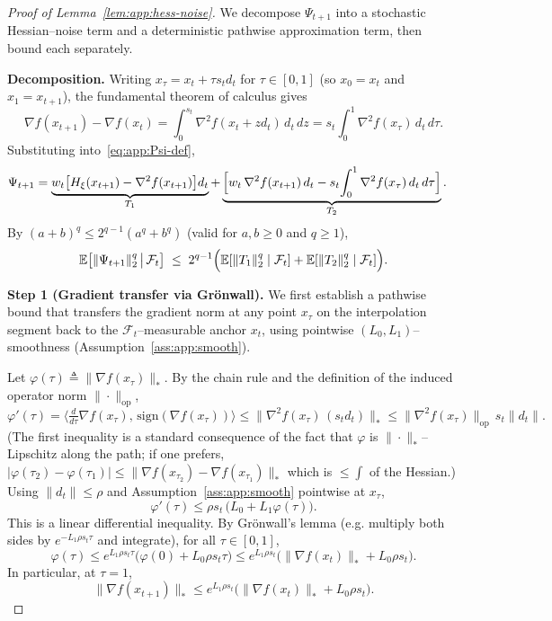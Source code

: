 \documentclass[10pt,a4paper]{amsart}
\begin{document}
\begin{proof}[Proof of Lemma~\ref{lem:app:hess-noise}]
We decompose $\Psi_{t+1}$ into a stochastic Hessian--noise term and a
deterministic pathwise approximation term, then bound each separately.

\smallskip\noindent\textbf{Decomposition.}
Writing $x_\tau = x_t + \tau s_t d_t$ for $\tau \in [0, 1]$ (so $x_0 =
x_t$ and $x_1 = x_{t+1}$), the fundamental theorem of calculus gives
\[
  \nabla f(x_{t+1}) - \nabla f(x_t)
  = \int_0^{s_t} \nabla^2 f(x_t + z d_t)\, d_t\, dz
  = s_t \int_0^1 \nabla^2 f(x_\tau)\, d_t\, d\tau.
\]
Substituting into~\eqref{eq:app:Psi-def},
\begin{align}
  \Psi_{t+1}
  &= \underbrace{w_t\bigl[H_\xi(x_{t+1}) - \nabla^2 f(x_{t+1})\bigr] d_t}_{T_1}
  + \underbrace{\Bigl[w_t\, \nabla^2 f(x_{t+1})\, d_t
      - s_t\!\int_0^1 \nabla^2 f(x_\tau)\, d_t\, d\tau\Bigr]}_{T_2}.
  \label{eq:app:Psi-decomp}
\end{align}
By $(a+b)^q \leq 2^{q-1}(a^q + b^q)$ (valid for $a, b \geq 0$ and $q \geq 1$),
\begin{equation}
  \mathbb{E}\bigl[\|\Psi_{t+1}\|_2^q \,\big|\, \mathcal{F}_t\bigr]
  \;\leq\; 2^{q-1}\Bigl(
    \mathbb{E}[\|T_1\|_2^q \mid \mathcal{F}_t]
    + \mathbb{E}[\|T_2\|_2^q \mid \mathcal{F}_t]\Bigr).
  \label{eq:app:Psi-split}
\end{equation}

\smallskip\noindent\textbf{Step 1 (Gradient transfer via Gr\"onwall).}
We first establish a pathwise bound that transfers the gradient norm at
any point $x_\tau$ on the interpolation segment back to the
$\mathcal{F}_t$--measurable anchor $x_t$, using pointwise
$(L_0, L_1)$--smoothness (Assumption~\ref{ass:app:smooth}).

Let $\varphi(\tau) \triangleq \|\nabla f(x_\tau)\|_*$. By the chain rule
and the definition of the induced operator norm $\|\cdot\|_{\mathrm{op}}$,
\[
  \varphi'(\tau)
  = \bigl\langle \tfrac{d}{d\tau}\nabla f(x_\tau),\,
      \mathrm{sign}(\nabla f(x_\tau))\bigr\rangle
  \leq \|\nabla^2 f(x_\tau)\,(s_t d_t)\|_*
  \leq \|\nabla^2 f(x_\tau)\|_{\mathrm{op}}\, s_t \|d_t\|.
\]
(The first inequality is a standard consequence of the fact that
$\varphi$ is $\|\cdot\|_*$--Lipschitz along the path; if one prefers,
$|\varphi(\tau_2) - \varphi(\tau_1)| \leq \|\nabla f(x_{\tau_2}) -
\nabla f(x_{\tau_1})\|_*$ which is $\leq \int$ of the Hessian.) Using
$\|d_t\| \leq \rho$ and Assumption~\ref{ass:app:smooth} pointwise at
$x_\tau$,
\[
  \varphi'(\tau) \leq \rho s_t\, \bigl(L_0 + L_1 \varphi(\tau)\bigr).
\]
This is a linear differential inequality. By Gr\"onwall's lemma (e.g.
multiply both sides by $e^{-L_1\rho s_t \tau}$ and integrate), for all
$\tau \in [0, 1]$,
\begin{equation}
  \varphi(\tau)
  \leq e^{L_1 \rho s_t \tau}\bigl(\varphi(0) + L_0 \rho s_t \tau\bigr)
  \leq e^{L_1 \rho s_t}\bigl(\|\nabla f(x_t)\|_* + L_0 \rho s_t\bigr).
  \label{eq:app:gronwall}
\end{equation}
In particular, at $\tau = 1$,
\begin{equation}
  \|\nabla f(x_{t+1})\|_*
  \leq e^{L_1 \rho s_t}\bigl(\|\nabla f(x_t)\|_* + L_0 \rho s_t\bigr).
  \label{eq:app:gronwall-endpoint}
\end{equation}


\end{proof}
\end{document}
